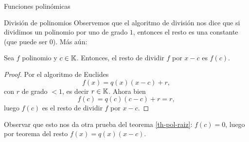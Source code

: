 \begin{chapter}{Funciones polinómicas}
\begin{section}{División de polinomios}
    Observemos que el algoritmo de división nos dice que si dividimos un polinomio por uno de grado $1$,  entonces el resto es una constante (que puede ser $0$). Más aún:

    \begin{teorema} Sea $f$ polinomio y $c \in \mathbb K$. Entonces,  el resto de dividir $f$ por $x-c$ es $f(c)$.
    \end{teorema}
    \begin{proof} Por  el algoritmo de Euclides
        \begin{equation*}
            f(x) = q(x)(x-c) + r,
        \end{equation*}
        con $r$ de grado $<1$,  es decir $r \in \mathbb K$.  Ahora bien
        \begin{equation*}
            f(c) = q(c)(c-c) + r = r,
        \end{equation*}
        luego $f(c)$  es el resto de dividir $f$ por $x-c$.
    \end{proof}

    Observar que esto  nos da otra prueba del teorema \ref{th-pol-raiz}: $f(c)=0$, luego por teorema del resto $ f(x)=q(x)(x-c)$.

 \end{section}

\end{chapter}

